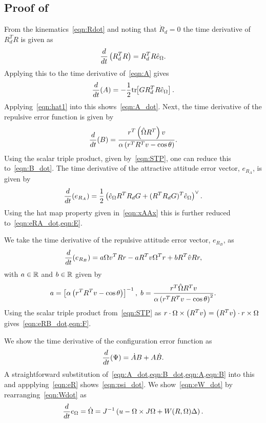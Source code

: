 \documentclass[fleqn]{IJCAS}  %
\begin{document}
\begin{multicols}{2}
\subsection{Proof of~}\label{proof:error_dyn}
From the kinematics~\cref{eqn:Rdot} and noting that \( \dot{R}_d = 0 \) the time derivative of \( R_d^T R \) is given as
\begin{gather*}
	\frac{d }{d t} \left( R_d^T R \right) = R_d^T R \hat{e}_\Omega .
\end{gather*}
Applying this to the time derivative of~\cref{eqn:A} gives
\begin{gather*}
	\frac{d }{d t} (A) = -\frac{1}{2} \mathrm{tr}\negthickspace\left[ G R_d^T R \hat{e}_\Omega \right] .
\end{gather*}
Applying~\cref{eqn:hat1} into this shows~\cref{eqn:A_dot}.
Next, the time derivative of the repulsive error function is given by
\begin{gather*}
	\frac{d }{d t} (B) = \frac{r^T \left( \hat{\Omega} R^T \right) v}{\alpha \left( r^T R^T v - \cos \theta \right)} .
\end{gather*}
Using the scalar triple product, given by~\cref{eqn:STP}, one can reduce this to~\cref{eqn:B_dot}.
The time derivative of the attractive attitude error vector, \( e_{R_A} \), is given by
\begin{gather*}
	\frac{d }{d t} ( e_{R_A}) = \frac{1}{2} \left( \hat{e}_\Omega R^T R_d G + (R^T R_d G)^T \hat{e}_\Omega \right)^\vee .
\end{gather*}
Using the hat map property given in~\cref{eqn:xAAx} this is further reduced to~\cref{eqn:eRA_dot,eqn:E}.

We take the time derivative of the repulsive attitude error vector, \( e_{R_B} \), as
\begin{gather*}
	\frac{d }{d t}( e_{R_B} )= a \Omega v^T R r - a R^T v \Omega^T r + b R^T \hat{v} R r ,
\end{gather*}
with \( a \in \mathbb{R} \) and \( b \in \mathbb{R}\) given by 
\begin{gather*}
	a = \left[ \alpha \left( r^T R^T v - \cos \theta \right) \right]^{-1} , \;
	b = \frac{r^T \hat{\Omega} R^T v}{\alpha \left( r^T R^T v - \cos \theta \right)^2} .
\end{gather*}
Using the scalar triple product from~\cref{eqn:STP} as \( r \cdot \Omega \times \left( R^T v \right) = \left( R^T v \right) \cdot r \times \Omega \) gives~\cref{eqn:eRB_dot,eqn:F}.

We show the time derivative of the configuration error function as
\begin{gather*}
	\frac{d }{d t} (\Psi) = \dot{A} B + A \dot{B} .
\end{gather*}
A straightforward substitution of~\cref{eqn:A_dot,eqn:B_dot,eqn:A,eqn:B} into this and appplying~\cref{eqn:eR} shows~\cref{eqn:psi_dot}.
We show~\cref{eqn:eW_dot} by rearranging~\cref{eqn:Wdot} as 
\begin{align*}
	\frac{d }{d t} e_\Omega = \dot{\Omega} = J^{-1} \left( u - \Omega \times J \Omega + W(R,\Omega) \Delta  \right) .
\end{align*}


\end{multicols}
\end{document}
